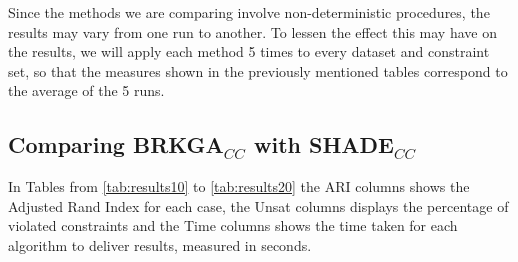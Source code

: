 \documentclass[review]{elsarticle}
\begin{document}
Since the methods we are comparing involve non-deterministic procedures, the results may vary from one run to another. To lessen the effect this may have on the results, we will apply each method 5 times to every dataset and constraint set, so that the measures shown in the previously mentioned tables correspond to the average of the 5 runs.

\subsection{Comparing BRKGA$_{CC}$ with SHADE$_{CC}$}

In Tables from \ref{tab:results10} to \ref{tab:results20} the ARI columns shows the Adjusted Rand Index for each case, the Unsat columns displays the percentage of violated constraints and the Time columns shows the time taken for each algorithm to deliver results, measured in seconds.
\end{document}
